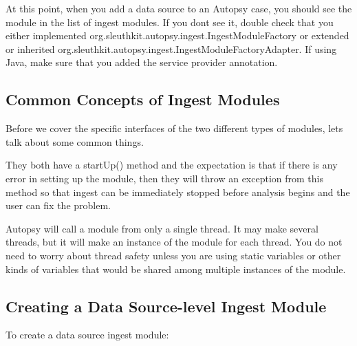 At this point, when you add a data source to an Autopsy case, you should see the module in the list of ingest modules. If you don\textquotesingle{}t see it, double check that you either implemented org.\+sleuthkit.\+autopsy.\+ingest.\+Ingest\+Module\+Factory or extended or inherited org.\+sleuthkit.\+autopsy.\+ingest.\+Ingest\+Module\+Factory\+Adapter. If using Java, make sure that you added the service provider annotation.\hypertarget{mod_ingest_page_ingest_modules_implementing_ingestmodule}{}\subsection{Common Concepts of Ingest Modules}\label{mod_ingest_page_ingest_modules_implementing_ingestmodule}
Before we cover the specific interfaces of the two different types of modules, let\textquotesingle{}s talk about some common things.
\begin{DoxyItemize}
\item They both have a start\+Up() method and the expectation is that if there is any error in setting up the module, then they will throw an exception from this method so that ingest can be immediately stopped before analysis begins and the user can fix the problem.
\item Autopsy will call a module from only a single thread. It may make several threads, but it will make an instance of the module for each thread. You do not need to worry about thread safety unless you are using static variables or other kinds of variables that would be shared among multiple instances of the module.
\end{DoxyItemize}\hypertarget{mod_ingest_page_ingest_modules_implementing_datasourceingestmodule}{}\subsection{Creating a Data Source-\/level Ingest Module}\label{mod_ingest_page_ingest_modules_implementing_datasourceingestmodule}
To create a data source ingest module\+:

